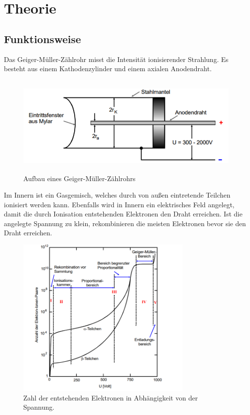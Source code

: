 \section{Theorie}
\label{sec:Theorie}

\cite{sample}

\subsection{Funktionsweise}
Das Geiger-Müller-Zählrohr misst die Intensität ionisierender Strahlung. Es besteht aus einem Kathodenzylinder und einem axialen
Anodendraht.

\begin{figure}[H]
  \centering
  \includegraphics[height=5cm]{geigerzaehler.PNG}
  \caption{Aufbau eines Geiger-Müller-Zählrohrs \cite{sample}}
  \label{fig:Linienspektrum}
\end{figure}

 Im Innern ist ein Gasgemisch, welches durch von außen eintretende Teilchen ionisiert werden kann. Ebenfalls wird in Innern ein elektrisches
 Feld angelegt, damit die durch Ionisation entstehenden Elektronen den Draht erreichen. Ist die angelegte Spannung zu klein,
 rekombinieren die meisten Elektronen bevor sie den Draht erreichen.

 \begin{figure}[H]
   \centering
   \includegraphics[height=8cm]{zonen.PNG}
   \caption{Zahl der entstehenden Elektronen in Abhängigkeit von der Spannung. \cite{sample}}
   \label{fig:Linienspektrum}
 \end{figure}

